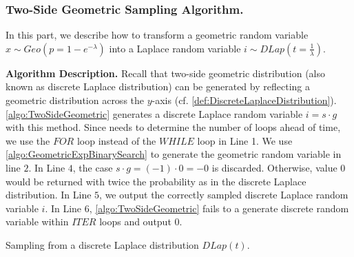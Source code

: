 \subsubsection{Two-Side Geometric Sampling Algorithm.}
\label{subsubsec:TwoSideGeometricSamplingAlgorithm}
In this part, we describe how to transform a geometric random variable $x \sim Geo\left(p=1-e^{-\lambda}\right) $ into a Laplace random variable $i\sim DLap\left(t=\frac{1}{\lambda}\right) $.

\textbf{Algorithm Description.}
Recall that two-side geometric distribution (also known as discrete Laplace distribution) can be generated by reflecting a geometric distribution across the $y$-axis (cf. \autoref{def:DiscreteLaplaceDistribution}).
\autoref{algo:TwoSideGeometric} generates a discrete Laplace random variable $i=s\cdot g$ with this method. Since \smpc needs to determine the number of loops ahead of time, we use the $FOR$ loop instead of the $WHILE$ loop in Line 1.
We use \autoref{algo:GeometricExpBinarySearch} to generate the geometric random variable in line $2$.
In Line $4$, the case $s\cdot g =\left(-1\right)\cdot 0 =-0$ is discarded. Otherwise, value $0$ would be returned with twice the probability as in the discrete Laplace distribution.
In Line $5$, we output the correctly sampled discrete Laplace random variable $i$.
In Line $6$, \autoref{algo:TwoSideGeometric} fails to a generate discrete random variable within $ITER$ loops and output $0$.

\begin{algorithm}[tbh!]
    \centering
    \caption{Sampling from a discrete Laplace distribution $ DLap\left(t\right) $.}
    \label{algo:TwoSideGeometric}
\end{algorithm}
\FloatBarrier

